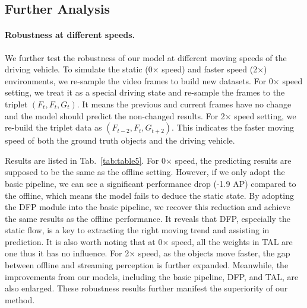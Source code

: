 \documentclass[10pt,twocolumn,letterpaper]{article}
\begin{document}
\subsection{Further Analysis}
\paragraph{Robustness at different speeds.}
We further test the robustness of our model at different moving speeds of the driving vehicle. To simulate the static (0$\times$ speed) and faster speed (2$\times$) environments, we re-sample the video frames to build new datasets. For 0$\times$ speed setting, we treat it as a special driving state and re-sample the frames to the triplet $(F_{t}, F_{t}, G_{t})$. It means the previous and current frames have no change and the model should predict the non-changed results.
For 2$\times$ speed setting, we re-build the triplet data as  $(F_{t-2}, F_{t}, G_{t+2})$. This indicates the faster moving speed of both the ground truth objects and the driving vehicle. 

Results are listed in Tab.~\ref{tab:table5}. For 0$\times$ speed, the predicting results are supposed to be the same as the offline setting. However, if we only adopt the basic pipeline, we can see a significant performance drop (-1.9 AP) compared to the offline, which means the model fails to deduce the static state. By adopting the DFP module into the basic pipeline, we recover this reduction and achieve the same results as the offline performance. It reveals that DFP, especially the static flow, is a key to extracting the right moving trend and assisting in prediction. It is also worth noting that at 0$\times$ speed, all the weights in TAL are one thus it has no influence. For 2$\times$ speed, as the objects move faster, the gap between offline and streaming perception is further expanded. Meanwhile, the improvements from our models, including the basic pipeline, DFP, and TAL, are also enlarged. These robustness results further manifest the superiority of our method.  

\begin{table}[t]
\centering
{} \caption{Results on different moving speed settings. The 0$\times$ static setting actually equals to the offline setting. Subscripts indicate different moving speeds.} \label{tab:table5}
\end{table}
\end{document}
